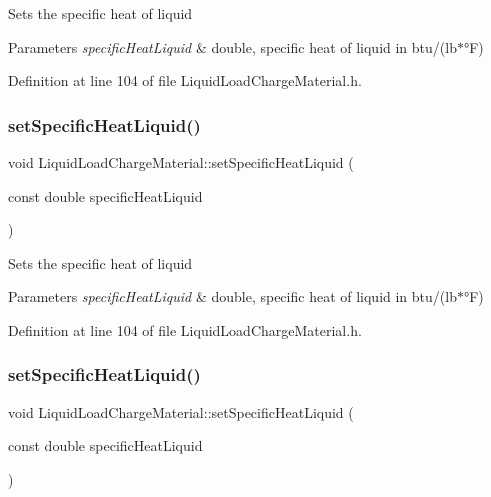 Sets the specific heat of liquid 
\begin{DoxyParams}{Parameters}
{\em specific\+Heat\+Liquid} & double, specific heat of liquid in btu/(lb$\ast$°F) \\
\hline
\end{DoxyParams}


Definition at line 104 of file Liquid\+Load\+Charge\+Material.\+h.

\mbox{\label{class_liquid_load_charge_material_a2187c4c6ba394c05ab42e769bf175683}} 
\subsubsection{\texorpdfstring{set\+Specific\+Heat\+Liquid()}{setSpecificHeatLiquid()}\hspace{0.1cm}{\footnotesize\ttfamily [2/3]}}
{\footnotesize\ttfamily void Liquid\+Load\+Charge\+Material\+::set\+Specific\+Heat\+Liquid (\begin{DoxyParamCaption}\item[{const double}]{specific\+Heat\+Liquid }\end{DoxyParamCaption})\hspace{0.3cm}{\ttfamily [inline]}}

Sets the specific heat of liquid 
\begin{DoxyParams}{Parameters}
{\em specific\+Heat\+Liquid} & double, specific heat of liquid in btu/(lb$\ast$°F) \\
\hline
\end{DoxyParams}


Definition at line 104 of file Liquid\+Load\+Charge\+Material.\+h.

\mbox{\label{class_liquid_load_charge_material_a2187c4c6ba394c05ab42e769bf175683}} 
\subsubsection{\texorpdfstring{set\+Specific\+Heat\+Liquid()}{setSpecificHeatLiquid()}\hspace{0.1cm}{\footnotesize\ttfamily [3/3]}}
{\footnotesize\ttfamily void Liquid\+Load\+Charge\+Material\+::set\+Specific\+Heat\+Liquid (\begin{DoxyParamCaption}\item[{const double}]{specific\+Heat\+Liquid }\end{DoxyParamCaption})\hspace{0.3cm}{\ttfamily [inline]}}

